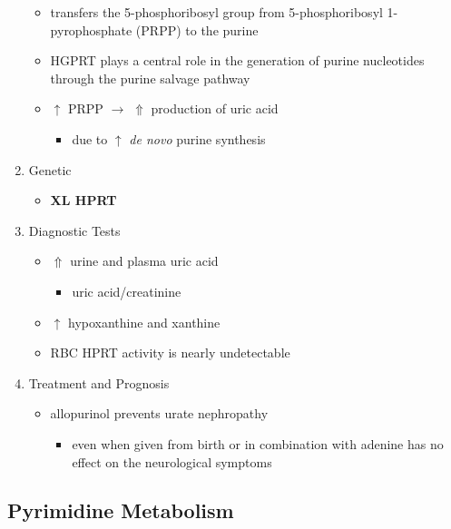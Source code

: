 \documentclass[12pt]{scrartcl}
\begin{document}
\begin{enumerate}

\begin{itemize}
\item transfers the 5-phosphoribosyl group from 5-phosphoribosyl
1-pyrophosphate (PRPP) to the purine
\item HGPRT plays a central role in the generation of purine nucleotides
through the purine salvage pathway
\item \(\uparrow\) PRPP \(\to\) \(\Uparrow\) production of uric acid
\begin{itemize}
\item due to \(\uparrow\) \emph{de novo} purine synthesis
\end{itemize}
\end{itemize}

\item Genetic
\label{sec:orga3ee64a}
\begin{itemize}
\item \textbf{XL HPRT}
\end{itemize}

\item Diagnostic Tests
\label{sec:orge26ccfb}
\begin{itemize}
\item \(\Uparrow\) urine and plasma uric acid
\begin{itemize}
\item uric acid/creatinine
\end{itemize}
\item \(\uparrow\) hypoxanthine and xanthine
\item RBC HPRT activity is nearly undetectable
\end{itemize}

\item Treatment and Prognosis
\label{sec:org535c0bd}
\begin{itemize}
\item allopurinol prevents urate nephropathy
\begin{itemize}
\item even when given from birth or in combination with adenine has no
effect on the neurological symptoms
\end{itemize}
\end{itemize}
\end{enumerate}

\subsection{Pyrimidine Metabolism}
\label{sec:orga08172b}
\end{document}
